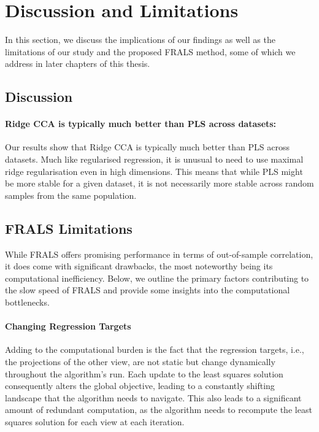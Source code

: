 \section{Discussion and Limitations}

In this section, we discuss the implications of our findings as well as the limitations of our study and the proposed FRALS method, some of which we address in later chapters of this thesis.

\subsection{Discussion}

\paragraph{Ridge CCA is typically much better than PLS across datasets:} Our results show that Ridge CCA is typically much better than PLS across datasets.
Much like regularised regression, it is unusual to need to use maximal ridge regularisation even in high dimensions.
This means that while PLS might be more stable for a given dataset, it is not necessarily more stable across random samples from the same population.

\subsection{FRALS Limitations}
While FRALS offers promising performance in terms of out-of-sample correlation, it does come with significant drawbacks, the most noteworthy being its computational inefficiency.
Below, we outline the primary factors contributing to the slow speed of FRALS and provide some insights into the computational bottlenecks.

\paragraph{Changing Regression Targets}\label{subsec:changing-regression-targets}
Adding to the computational burden is the fact that the regression targets, i.e., the projections of the other view, are not static but change dynamically throughout the algorithm's run.
Each update to the least squares solution consequently alters the global objective, leading to a constantly shifting landscape that the algorithm needs to navigate.
This also leads to a significant amount of redundant computation, as the algorithm needs to recompute the least squares solution for each view at each iteration.

